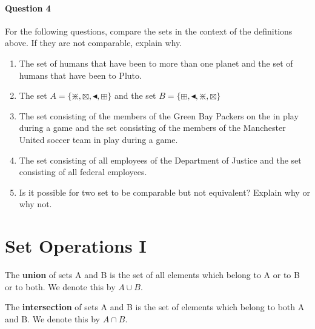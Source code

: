 \paragraph{Question 4}
For the following questions, compare the sets in the context of the definitions above. If they are not comparable, explain why.
\begin{enumerate}
    
    \item The set of humans that have been to more than one planet and the set of humans that have been to Pluto.
    \vspace{5em}
    
    \item The set $A = \{ \divideontimes, \boxtimes, \blacktriangleleft, \boxplus \} $ and the set $B = \{ \boxplus, \blacktriangleleft, \divideontimes, \boxtimes \} $
    \vspace{5em}
    
    \item The set consisting of the members of the Green Bay Packers on the in play during a game and the set consisting of the members of the Manchester United soccer team in play during a game.
    \vspace{5em}
    
    \item The set consisting of all employees of the Department of Justice and the set consisting of all federal employees.
    \vspace{5em}
    
    \item Is it possible for two set to be comparable but not equivalent? Explain why or why not.
    \vspace{5em}
    
    
\end{enumerate}




\section{Set Operations I}
\begin{definition}
The \textbf{union} of sets A and B is the set of all elements which belong to A or to B or to both. We denote this by $A \cup B$.
\end{definition}

\begin{definition}
The \textbf{intersection} of sets A and B is the set of elements which belong to both A and B. We denote this by $A \cap B$.
\end{definition}



